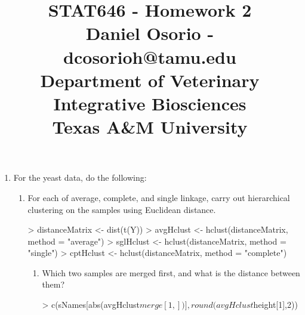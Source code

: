 \documentclass[12pt,a4paper]{paper}
\begin{document}
\title{STAT646 - Homework 2\\\small{Daniel Osorio - dcosorioh@tamu.edu\\Department of Veterinary Integrative Biosciences\\Texas A\&M University}}
\maketitle

\begin{enumerate}
\item For the yeast data, do the following:
\begin{Schunk}
\end{Schunk}
\begin{enumerate}
\item For each of average, complete, and single linkage, carry out hierarchical clustering on
the samples using Euclidean distance.
\begin{Schunk}
\begin{Sinput}
> distanceMatrix <- dist(t(Y))
> avgHclust <- hclust(distanceMatrix, method = "average")
> sglHclust <- hclust(distanceMatrix, method = "single")
> cptHclust <- hclust(distanceMatrix, method = "complete")
\end{Sinput}
\end{Schunk}
\begin{enumerate}
\item Which two samples are merged first, and what is the distance between them?
\begin{Schunk}
\begin{Sinput}
> c(sNames[abs(avgHclust$merge[1,])], round(avgHclust$height[1],2))
\end{Sinput}

\end{Schunk}
\end{enumerate}
\end{enumerate}
\end{enumerate}
\end{document}
